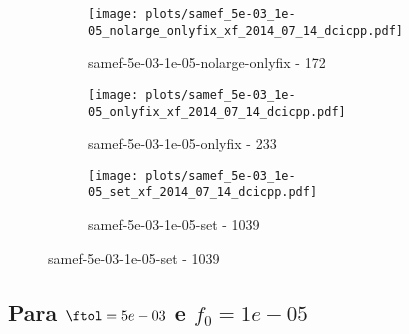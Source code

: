 \begin{figure}[H]
\begin{subfigure}{0.48\textwidth}
  \end{subfigure}
  \begin{subfigure}{0.48\textwidth}
    \texttt{[image: plots/samef\_5e-03\_1e-05\_nolarge\_onlyfix\_xf\_2014\_07\_14\_dcicpp.pdf]}
    \caption{samef-5e-03-1e-05-nolarge-onlyfix - 172}
  \end{subfigure}
  \begin{subfigure}{0.48\textwidth}
    \texttt{[image: plots/samef\_5e-03\_1e-05\_onlyfix\_xf\_2014\_07\_14\_dcicpp.pdf]}
    \caption{samef-5e-03-1e-05-onlyfix - 233}
  \end{subfigure}
  \begin{subfigure}{0.48\textwidth}
    \texttt{[image: plots/samef\_5e-03\_1e-05\_set\_xf\_2014\_07\_14\_dcicpp.pdf]}
    \caption{samef-5e-03-1e-05-set - 1039}
  \end{subfigure}
\end{figure}

\newpage
\subsection{Para $\ftol = 5e-03$ e $f_0 = 1e-05$}

